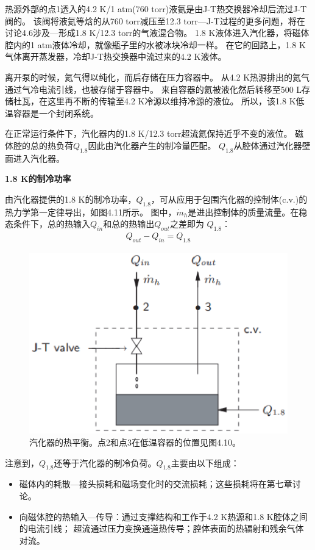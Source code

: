 热源外部的点1透入的4.2 K/1 atm(760 torr)液氦是由J-T热交换器冷却后流过J-T阀的。
该阀将液氦等焓的从760 torr减压至12.3 torr---J-T过程的更多问题，将在讨论4.6涉及---形成1.8 K/12.3 torr的气液混合物。
1.8 K液体进入汽化器，将磁体腔内的1 atm液体冷却，就像瓶子里的水被冰块冷却一样。
在它的回路上，1.8 K气体离开蒸发器，冷却J-T热交换器中流过来的4.2 K液体。

离开泵的时候，氦气得以纯化，而后存储在压力容器中。
从4.2 K热源排出的氦气通过气冷电流引线，也被存储于容器中。
来自容器的氦被液化然后转移至500 L存储杜瓦，在这里再不断的传输至4.2 K冷源以维持冷源的液位。
所以，该1.8 K低温容器是一个封闭系统。

在正常运行条件下，汽化器内的1.8 K/12.3 torr超流氦保持近乎不变的液位。
磁体腔的总的热负荷$Q_{1.8}$因此由汽化器产生的制冷量匹配。
$Q_{1.8}$从腔体通过汽化器壁面进入汽化器。

\textbf{1.8 K的制冷功率}

由汽化器提供的1.8 K的制冷功率，$Q_{1.8}$，可从应用于包围汽化器的控制体(c.v.)的热力学第一定律导出，如图4.11所示。
图中，$\dot{m}_h$是进出控制体的质量流量。在稳态条件下，总的热输入$Q_{in}$和总的热输出$Q_{out}$之差即为
$Q_{1.8}$：
\begin{align}%
Q_{out}-Q_{in}=Q_{1.8}
\end{align}

\begin{figure}[htbp]
	\centering
	\includegraphics[scale=0.6]{chpt4/figs/fig4.11.eps}
	\caption{汽化器的热平衡。点2和点3在低温容器的位置见图4.10。}
\end{figure}

注意到，$Q_{1.8}$还等于汽化器的制冷负荷。$Q_{1.8}$主要由以下组成：
\begin{itemize}
	\item 磁体内的耗散---接头损耗和磁场变化时的交流损耗；这些损耗将在第七章讨论。
	\item 向磁体腔的热输入---传导：通过支撑结构和工作于4.2 K热源和1.8 K腔体之间的电流引线；
	超流通过压力变换通道热传导；腔体表面的热辐射和残余气体对流。
\end{itemize}


